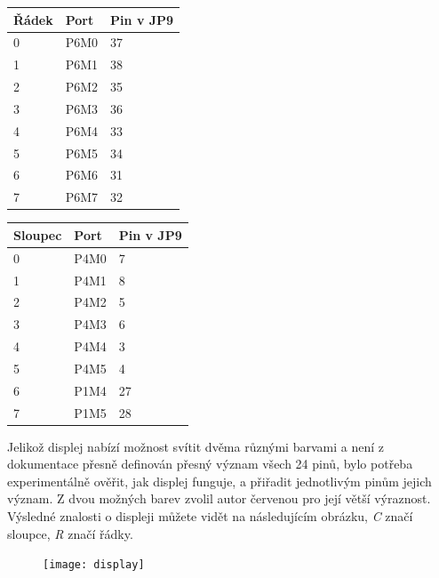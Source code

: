 \documentclass[12pt,a4paper,titlepage]{article}
\begin{document}
\begin{minipage}{\linewidth}
\bigskip
\centering
  \begin{tabular}{ | l | l | l | }
    \hline
    Řádek & Port & Pin v JP9\\ \hline
    0 & P6M0 & 37\\ \hline
    1 & P6M1 & 38\\ \hline
    2 & P6M2 & 35\\ \hline
	3 & P6M3 & 36\\ \hline
	4 & P6M4 & 33\\ \hline
	5 & P6M5 & 34\\ \hline
	6 & P6M6 & 31\\ \hline
    7 & P6M7 & 32\\
    \hline
  \end{tabular}
  \begin{tabular}{ | l | l | l | }
    \hline
    Sloupec & Port & Pin v JP9\\ \hline
    0 & P4M0 & 7\\ \hline
    1 & P4M1 & 8\\ \hline
    2 & P4M2 & 5\\ \hline
	3 & P4M3 & 6\\ \hline
	4 & P4M4 & 3\\ \hline
	5 & P4M5 & 4\\ \hline
	6 & P1M4 & 27\\ \hline
    7 & P1M5 & 28\\
    \hline
  \end{tabular}
   \label{fitkit:display}

\bigskip
\end{minipage}

Jelikož displej nabízí možnost svítit dvěma různými barvami a není z dokumentace přesně definován přesný význam všech 24  pinů, bylo potřeba experimentálně ověřit, jak displej funguje, a přiřadit jednotlivým pinům jejich význam. Z dvou možných barev zvolil autor červenou pro její větší výraznost. Výsledné znalosti o displeji můžete vidět na následujícím obrázku, \textit{C} značí sloupce, \textit{R} značí řádky.

\begin{figure}[h]
\centering
\texttt{[image: display]}
 \label{display}
\end{figure}
\end{document}
